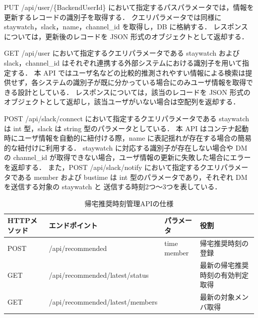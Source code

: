 PUT /api/user/\{BackendUserId\} において指定するパスパラメータでは，情報を更新するレコードの識別子を取得する．
クエリパラメータでは同様に staywatch，slack，name，channel\_id を取得し，DB に格納する．
レスポンスについては，更新後のレコードを JSON 形式のオブジェクトとして返却する．

GET /api/user において指定するクエリパラメータである staywatch および slack，channel\_id はそれぞれ連携する外部システムにおける識別子を用いて指定する．
本 API ではユーザ名などの比較的推測されやすい情報による検索は提供せず，各システムの識別子が既に分かっている場合にのみユーザ情報を取得できる設計としている．
レスポンスについては，該当のレコードを JSON 形式のオブジェクトとして返却し，該当ユーザがいない場合は空配列を返却する．

POST /api/slack/connect において指定するクエリパラメータである staywatch は int 型，slack は string 型のパラメータとしている．
本 API はコンテナ起動時にユーザ情報を自動的に紐付ける際，name に表記揺れが存在する場合の簡易的な紐付けに利用する．
staywatch に対応する識別子が存在しない場合や DM の channel\_id が取得できない場合，ユーザ情報の更新に失敗した場合にエラーを返却する．
また，POST /api/slack/notify において指定するクエリパラメータである member および bustime は int 型のパラメータであり，それぞれ DM を送信する対象の staywatch と 送信する時刻2つ〜3つを表している．


\begin{table}[htb]
  \captionsetup[table]{justification=centering}
  \centering
  \caption{帰宅推奨時刻管理APIの仕様}
  \label{tab:recommendedAPI}
  \begin{tabular}{|
    >{\centering\arraybackslash}m{1.5cm}|
    >{\raggedright\arraybackslash}m{6cm}|
    >{\centering\arraybackslash}m{2cm}|
    >{\centering\arraybackslash}m{3.5cm}|}
    \hline
    \textbf{HTTPメソッド} & \textbf{エンドポイント}                & \textbf{パラメータ} & \textbf{役割} \\
    \hline
    POST
                      & /api/recommended
                      & \makecell[c]{time                                              \\member}
                      & 帰宅推奨時刻の登録                                                      \\
    \hline
    GET
                      & /api/recommended/latest/status
                      &
                      & 最新の帰宅推奨時刻の有効判定取得                                               \\
    \hline
    GET
                      & /api/recommended/latest/members
                      &
                      & 最新の対象メンバ取得                                                     \\
    \hline
  \end{tabular}
\end{table}

